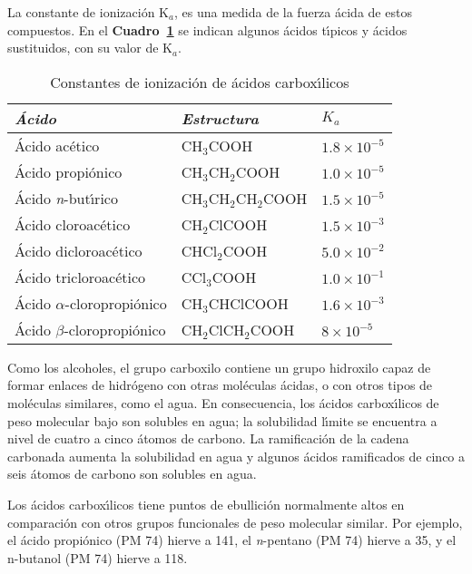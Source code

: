 La constante de ionizaci\'on K$_a$, es una medida de la fuerza \'acida de estos compuestos. En el \textbf{Cuadro~\ref{hcooh}} se indican algunos \'acidos t\'{\i}picos y \'acidos sustituidos, con su valor de K$_a$.
\begin{table}[hbt]
\caption{Constantes de ionizaci\'on de \'acidos carbox\'{\i}licos}
\label{hcooh}
\begin{center}
{\footnotesize \begin{tabular}{lll}\hline
\textit{\'Acido} &\textit{Estructura}& $K_a$\\\hline
\'Acido ac\'etico    &CH$_3$COOH              &$1.8\times10^{-5}$\\
\'Acido propi\'onico &CH$_3$CH$_2$COOH        &$1.0\times10^{-5}$\\
\'Acido \textit{n}-but\'{\i}rico&CH$_3$CH$_2$CH$_2$COOH 
&$1.5\times10^{-5}$\\
\'Acido cloroac\'etico &CH$_2$ClCOOH  &$1.5\times10^{-3}$\\
\'Acido dicloroac\'etico &CHCl$_2$COOH  &$5.0\times10^{-2}$\\
\'Acido tricloroac\'etico &CCl$_3$COOH  &$1.0\times10^{-1}$\\
\'Acido $\alpha$-cloropropi\'onico &CH$_3$CHClCOOH  &$1.6\times10^{-3}$\\
\'Acido $\beta $-cloropropi\'onico &CH$_2$ClCH$_2$COOH 
&$8\times10^{-5}$\\[.05in]\hline
\end{tabular}
}
\end{center}
\end{table}
Como los alcoholes, el grupo  carboxilo contiene un grupo hidroxilo capaz de formar enlaces de hidr\'ogeno con otras mol\'eculas \'acidas, o con  otros tipos de mol\'eculas similares, como el agua. En consecuencia, los \'acidos carbox\'{\i}licos de peso molecular bajo son solubles en agua; la solubilidad l\'{\i}mite se encuentra a nivel de cuatro a cinco \'atomos de carbono. La ramificaci\'on de la cadena carbonada aumenta la solubilidad en agua y algunos \'acidos ramificados de cinco a seis \'atomos de carbono son solubles en agua.

Los \'acidos carbox\'{\i}licos tiene puntos de ebullici\'on normalmente altos en comparaci\'on con otros grupos funcionales de peso molecular similar. Por ejemplo, el \'acido propi\'onico (PM 74) hierve a 141\celsius, el \textit{n}-pentano (PM 74) hierve a 35\celsius, y el n-butanol (PM 74) hierve a 118\celsius. 


